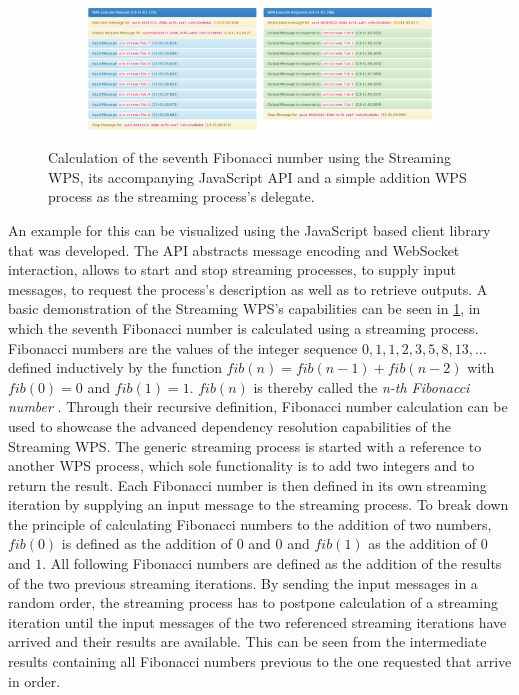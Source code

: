 \begin{figure}
\begin{subfigure}{\fibfigsize}
        \includegraphics[width = \linewidth]{figures/fibonacci-4.png}
      \end{subfigure}
      \caption{\label{fig:client}Calculation of the seventh Fibonacci number using the Streaming WPS, its accompanying JavaScript API and a simple addition WPS process as the streaming process's delegate.}
    \end{figure}

    An example for this can be visualized using the JavaScript based client library that was developed. The \ac{API} abstracts message encoding and WebSocket interaction, allows to start and stop streaming processes, to supply input messages, to request the process's description as well as to retrieve outputs. A basic demonstration of the Streaming WPS's capabilities can be seen in \cref{fig:client}, in which the seventh Fibonacci number is calculated using a streaming process. Fibonacci numbers are the values of the integer sequence $0, 1, 1, 2, 3, 5, 8, 13, \dots$ defined inductively by the function $fib(n) = fib(n-1) + fib(n-2)$ with $fib(0) = 0$ and $fib(1) = 1$. $fib(n)$ is thereby called the \emph{n-th Fibonacci number} \citep{fibonacci}. Through their recursive definition, Fibonacci number calculation can be used to showcase the advanced dependency resolution capabilities of the Streaming WPS. The generic streaming process is started with a reference to another WPS process, which sole functionality is to add two integers and to return the result. Each Fibonacci number is then defined in its own streaming iteration by supplying an input message to the streaming process. To break down the principle of calculating Fibonacci numbers to the addition of two numbers, $fib(0)$ is defined as the addition of $0$ and $0$ and $fib(1)$ as the addition of $0$ and $1$. All following Fibonacci numbers are defined as the addition of the results of the two previous streaming iterations. By sending the input messages in a random order, the streaming process has to postpone calculation of a streaming iteration until the input messages of the two referenced streaming iterations have arrived and their results are available. This can be seen from the intermediate results containing all Fibonacci numbers previous to the one requested that arrive in order.

